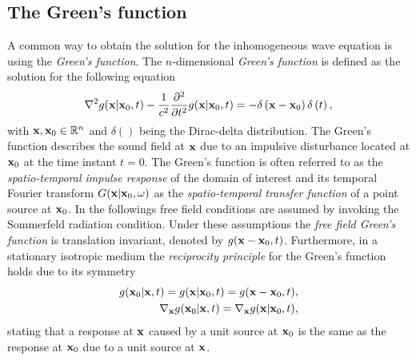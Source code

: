 \subsection{The Green's function}
A common way to obtain the solution for the inhomogeneous wave equation is using the \emph{Green's function}. 
The $n$-dimensional \emph{Green's function} is defined as the solution for the following equation \cite{Gumerov2004, Williams1999}
\begin{equation}
\nabla^2 g(\mathbf{x}|\mathbf{x}_0,t) -\frac{1}{c^2}\frac{\partial^2}{\partial t^2} g(\mathbf{x}|\mathbf{x}_0,t) = -\delta\left( \mathbf{x} - \mathbf{x}_0 \right)\delta\left( t \right),\label{Eq:Theory:Green_function_def}
\end{equation}
with $\mathbf{x}, \mathbf{x}_0 \in \mathbb{R}^{n}$ and $\delta()$ being the Dirac-delta distribution. 
The Green's function describes the sound field at $\mathbf{x}$ due to an impulsive disturbance located at $\mathbf{x}_0$ at the time instant $t = 0$.
The Green's function is often referred to as the \emph{spatio-temporal impulse response} of the domain of interest and its temporal Fourier transform $G(\mathbf{x}|\mathbf{x}_0,\omega)$ as the \emph{spatio-temporal transfer function} of a point source at $\mathbf{x}_0$. 
In the followings free field conditions are assumed by invoking the Sommerfeld radiation condition. 
Under these assumptions the \emph{free field Green's function} is translation invariant, denoted by $g(\mathbf{x}-\mathbf{x}_0,t)$.
Furthermore, in a stationary isotropic medium the \emph{reciprocity principle} for the Green's function holds due to its symmetry \cite{Stakgold2011}
\begin{eqnarray}
\label{Eq:Theory:Green_fun_reciprocity}
g(\mathbf{x}_0|\mathbf{x},t) = g(\mathbf{x}|\mathbf{x}_0,t) = g(\mathbf{x}-\mathbf{x}_0,t), \\
\nabla_{\mathbf{x}} g(\mathbf{x}_0|\mathbf{x},t)= \nabla_{\mathbf{x}} g(\mathbf{x}|\mathbf{x}_0,t),
\end{eqnarray}
stating that a response at $\mathbf{x}$ caused by a unit source at $\mathbf{x}_0$ is the same as the response at $\mathbf{x}_0$ due to a unit source at $\mathbf{x}$.

